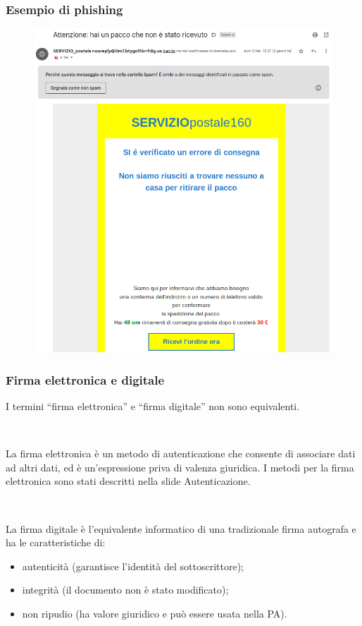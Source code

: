 \documentclass[]{beamer}
\begin{document}
\begin{frame}
\frametitle{Esempio di phishing}
\begin{figure}
  \includegraphics[width=.6\columnwidth]{img/phishing.png}
\end{figure}
\end{frame}



\begin{frame}
\frametitle{Firma elettronica e digitale}
I termini ``firma elettronica'' e ``firma digitale'' non sono equivalenti.\pause

~

La firma elettronica è un metodo di autenticazione che consente di associare dati ad altri dati, ed è un'espressione priva di valenza giuridica. I metodi per la firma elettronica sono stati descritti nella slide \alert<2>{Autenticazione}.\pause

~

La firma digitale è l'equivalente informatico di una tradizionale firma autografa e ha le caratteristiche di:
\begin{itemize}
  \item autenticità (garantisce l'identità del sottoscrittore);
  \item integrità (il documento non è stato modificato);
  \item non ripudio (ha valore giuridico e può essere usata nella PA).
\end{itemize}
\end{frame}
\end{document}
